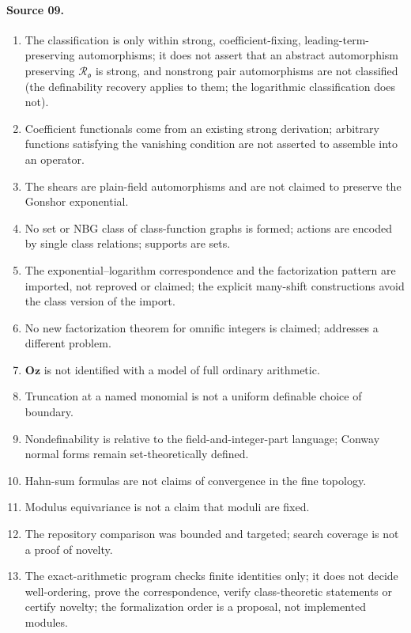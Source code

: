 \documentclass[11pt,oneside]{article}
\numberwithin{equation}{section}
\theoremstyle{definition}
\theoremstyle{remark}
\newcommand{\Oz}{\mathbf{Oz}}
\newcommand{\oo}{\mathfrak o}
\newcommand{\Ro}{\mathcal R_{\oo}}
\begin{document}
\paragraph{Source 09.}
\begin{enumerate}[itemsep=1pt]
\item The classification is only within strong, coefficient-fixing,
leading-term-preserving automorphisms; it does not assert that an abstract
automorphism preserving $\Ro$ is strong, and nonstrong pair automorphisms are not
classified (the definability recovery applies to them; the logarithmic classification
does not).
\item Coefficient functionals come from an existing strong derivation; arbitrary
functions satisfying the vanishing condition are not asserted to assemble into an
operator.
\item The shears are plain-field automorphisms and are not claimed to preserve the
Gonshor exponential.
\item No set or NBG class of class-function graphs is formed; actions are encoded by
single class relations; supports are sets.
\item The exponential--logarithm correspondence and the factorization pattern are
imported, not reproved or claimed; the explicit many-shift constructions avoid the
class version of the import.
\item No new factorization theorem for omnific integers is claimed; \cite{LM} addresses a
different problem.
\item $\Oz$ is not identified with a model of full ordinary arithmetic.
\item Truncation at a named monomial is not a uniform definable choice of boundary.
\item Nondefinability is relative to the field-and-integer-part language; Conway normal
forms remain set-theoretically defined.
\item Hahn-sum formulas are not claims of convergence in the fine topology.
\item Modulus equivariance is not a claim that moduli are fixed.
\item The repository comparison was bounded and targeted; search coverage is not a
proof of novelty.
\item The exact-arithmetic program checks finite identities only; it does not decide
well-ordering, prove the correspondence, verify class-theoretic statements or certify
novelty; the formalization order is a proposal, not implemented modules.
\end{enumerate}
\end{document}
